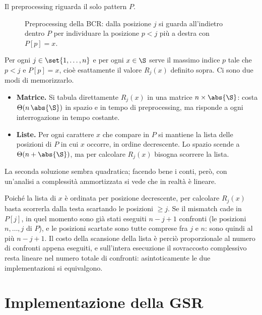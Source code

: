 Il preprocessing riguarda il solo pattern $P$.

\begin{figure}[H]
\centering

\caption{Preprocessing della BCR: dalla posizione $j$ si guarda all'indietro dentro
$P$ per individuare la posizione $p<j$ più a destra con $P[p]=x$.}
\end{figure}

Per ogni $j\in\set{1,\dots,n}$ e per ogni $x\in\alfa$ serve il massimo indice $p$
tale che $p<j$ e $P[p]=x$, cioè esattamente il valore $R_j(x)$ definito sopra. Ci
sono due modi di memorizzarlo.

\begin{itemize}
  \item \textbf{Matrice.} Si tabula direttamente $R_j(x)$ in una matrice
  $n\times\abs{\alfa}$: costa $\Th(n\,\abs{\alfa})$ in spazio e in tempo di
  preprocessing, ma risponde a ogni interrogazione in tempo costante.

  \item \textbf{Liste.} Per ogni carattere $x$ che compare in $P$ si mantiene la
  lista delle posizioni di $P$ in cui $x$ occorre, in ordine decrescente. Lo spazio
  scende a $\Th(n+\abs{\alfa})$, ma per calcolare $R_j(x)$ bisogna scorrere la
  lista.
\end{itemize}

La seconda soluzione sembra quadratica; facendo bene i conti, però, con un'analisi a
complessità ammortizzata si vede che in realtà è lineare.

\begin{osservazione}
Poiché la lista di $x$ è ordinata per posizione decrescente, per calcolare $R_j(x)$
basta scorrerla dalla testa scartando le posizioni $\ge j$. Se il mismatch cade in
$P[j]$, in quel momento sono già stati eseguiti $n-j+1$ confronti (le posizioni
$n,\dots,j$ di $P$), e le posizioni scartate sono tutte comprese fra $j$ e $n$:
sono quindi al più $n-j+1$. Il costo della scansione della lista è perciò
proporzionale al numero di confronti appena eseguiti, e sull'intera esecuzione il
sovraccosto complessivo resta lineare nel numero totale di confronti:
asintoticamente le due implementazioni si equivalgono.
\end{osservazione}

\section{Implementazione della GSR}\label{sec:bm-gsr}


